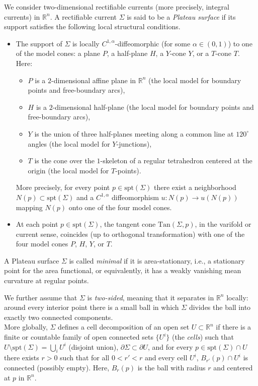 \documentclass[11pt]{amsart}
\numberwithin{equation}{section}
\theoremstyle{theorem}
\theoremstyle{definition}
\numberwithin{equation}{section}
\begin{document}
We consider two-dimensional rectifiable currents (more precisely, integral currents) in $\mathbb{R}^n$. A rectifiable current $\Sigma$ is said to be a \emph{Plateau surface} if its support satisfies the following local structural conditions.

\begin{itemize}
    \item The support of $\Sigma$ is locally $C^{1,\alpha}$-diffeomorphic (for some $\alpha \in (0,1)$) to one of the model cones: a plane $P$, a half-plane $H$, a $Y$-cone $Y$, or a $T$-cone $T$. Here:
    \begin{itemize}
        \item $P$ is a $2$-dimensional affine plane in $\mathbb{R}^n$ (the local model for boundary points and free-boundary arcs),
        \item $H$ is a $2$-dimensional half-plane (the local model for boundary points and free-boundary arcs),
        \item $Y$ is the union of three half-planes meeting along a common line at $120^\circ$ angles (the local model for $Y$-junctions),
        \item $T$ is the cone over the $1$-skeleton of a regular tetrahedron centered at the origin (the local model for $T$-points).
    \end{itemize}
    More precisely, for every point $p \in \mathrm{spt}(\Sigma)$ there exist a neighborhood $N(p) \subset \mathrm{spt}(\Sigma)$ and a $C^{1,\alpha}$ diffeomorphism $u : N(p) \to u(N(p))$ mapping $N(p)$ onto one of the four model cones.
    
    \item At each point $p \in \mathrm{spt}(\Sigma)$, the tangent cone $\mathrm{Tan}(\Sigma, p)$, in the varifold or current sense, coincides (up to orthogonal transformation) with one of the four model cones $P$, $H$, $Y$, or $T$.
\end{itemize}

A Plateau surface $\Sigma$ is called \emph{minimal} if it is area-stationary, i.e., a stationary point for the area functional, or equivalently, it has a weakly vanishing mean curvature at regular points.
\medskip

We further assume that $\Sigma$ is \emph{two-sided}, meaning that it separates in $\mathbb{R}^n$ locally: around every interior point there is a small ball in which $\Sigma$ divides the ball into exactly two connected components.\\
More globally, $\Sigma$ defines a cell decomposition of an open set $U \subset \mathbb{R}^n$ if there is a finite or countable family of open connected sets $\{U^i\}$ (the \emph{cells}) such that $U \setminus \mathrm{spt}(\Sigma) = \bigcup_i U^i$ (disjoint union), $\partial \Sigma \subset \partial U$, and for every $p \in \mathrm{spt}(\Sigma) \cap U$ there exists $r>0$ such that for all $0 < r' < r$ and every cell $U^i$, $B_{r'}(p) \cap U^i$ is connected (possibly empty). Here, $B_r(p)$ is the ball with radius $r$ and centered at $p$ in $\mathbb{R}^n$.
\medskip
\end{document}
